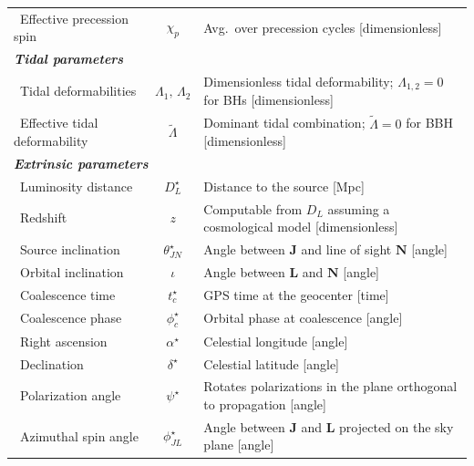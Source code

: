 {\begin{longtable}{lcp{9cm}}
\, Effective precession spin & $\chi_p$ &
Avg.\ over precession cycles \cite{effective_precession_spin} [dimensionless] \\

\multicolumn{3}{l}{\textit{\textbf{Tidal parameters}}} \\
\hline
\addlinespace[5pt]

\, Tidal deformabilities & $\Lambda_1,\,\Lambda_2$ &
Dimensionless tidal deformability; $\Lambda_{1,2}=0$ for BHs [dimensionless] \\

\, Effective tidal deformability & $\tilde{\Lambda}$ &
Dominant tidal combination; $\tilde{\Lambda}=0$ for BBH [dimensionless] \\

\multicolumn{3}{l}{\textit{\textbf{Extrinsic parameters}}} \\
\hline
\addlinespace[5pt]

\, Luminosity distance & $D_L^\star$ &
Distance to the source [Mpc] \\

\, Redshift & $z$ &
Computable from $D_L$ assuming a cosmological model [dimensionless] \\

\, Source inclination & $\theta_{JN}^\star$ &
Angle between $\mathbf{J}$ and line of sight $\mathbf{N}$ [angle] \\

\, Orbital inclination & $\iota$ &
Angle between $\mathbf{L}$ and $\mathbf{N}$ [angle] \\

\, Coalescence time & $t_c^\star$ &
GPS time at the geocenter [time] \\

\, Coalescence phase & $\phi_c^\star$ &
Orbital phase at coalescence [angle] \\

\, Right ascension & $\alpha^\star$ &
Celestial longitude [angle] \\

\, Declination & $\delta^\star$ &
Celestial latitude [angle] \\

\, Polarization angle & $\psi^\star$ &
Rotates polarizations in the plane orthogonal to propagation [angle] \\

\, Azimuthal spin angle & $\phi_{JL}^\star$ &
Angle between $\mathbf{J}$ and $\mathbf{L}$ projected on the sky plane [angle] \\
\end{longtable}
}



